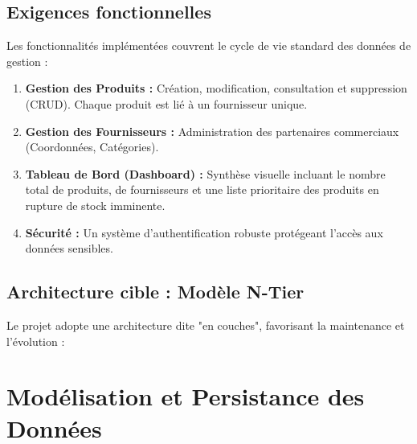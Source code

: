 \documentclass[12pt,a4paper]{report}
\begin{document}
\section{Exigences fonctionnelles}
Les fonctionnalités implémentées couvrent le cycle de vie standard des données de gestion :
\begin{enumerate}
    \item \textbf{Gestion des Produits :} Création, modification, consultation et suppression (CRUD). Chaque produit est lié à un fournisseur unique.
    \item \textbf{Gestion des Fournisseurs :} Administration des partenaires commerciaux (Coordonnées, Catégories).
    \item \textbf{Tableau de Bord (Dashboard) :} Synthèse visuelle incluant le nombre total de produits, de fournisseurs et une liste prioritaire des produits en rupture de stock imminente.
    \item \textbf{Sécurité :} Un système d'authentification robuste protégeant l'accès aux données sensibles.
\end{enumerate}

\section{Architecture cible : Modèle N-Tier}
Le projet adopte une architecture dite "en couches", favorisant la maintenance et l'évolution :

\begin{center}
\end{center}

\chapter{Modélisation et Persistance des Données}
\end{document}
